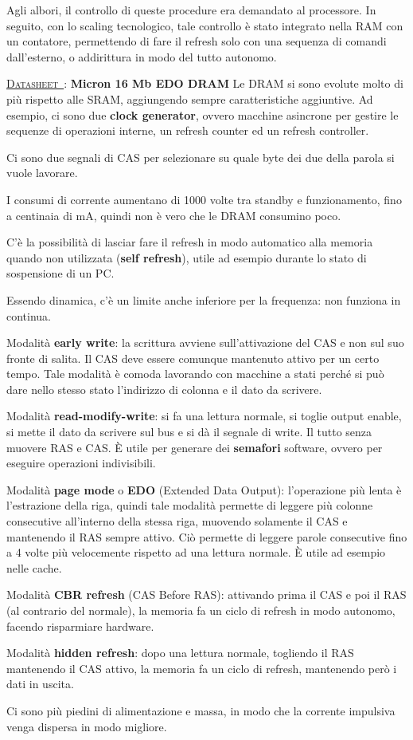 \documentclass[11pt,4paper]{report}
\newcounter{datasheetcnt}
\renewcommand{\thedatasheetcnt}{\arabic{datasheetcnt}}
\newenvironment{datasheet}[2]{\refstepcounter{datasheetcnt}\par\bigskip\medskip \label{#2}
	\noindent \underline{\textsc{Datasheet~\thedatasheetcnt}}: \textbf{#1} \newline}{\medskip}
\begin{document}
Agli albori, il controllo di queste procedure era demandato al processore. In seguito, con lo scaling tecnologico, tale controllo è stato integrato nella RAM con un contatore, permettendo di fare il refresh solo con una sequenza di comandi dall'esterno, o addirittura in modo del tutto autonomo.
\begin{datasheet}{Micron 16 Mb EDO DRAM}{}
Le DRAM si sono evolute molto di più rispetto alle SRAM, aggiungendo sempre caratteristiche aggiuntive. Ad esempio, ci sono due \textbf{clock generator}, ovvero macchine asincrone per gestire le sequenze di operazioni interne, un refresh counter ed un refresh controller.

Ci sono due segnali di CAS per selezionare su quale byte dei due della parola si vuole lavorare.

I consumi di corrente aumentano di 1000 volte tra standby e funzionamento, fino a centinaia di \si{\milli\ampere}, quindi non è vero che le DRAM consumino poco.

C'è la possibilità di lasciar fare il refresh in modo automatico alla memoria quando non utilizzata (\textbf{self refresh}), utile ad esempio durante lo stato di sospensione di un PC.

Essendo dinamica, c'è un limite anche inferiore per la frequenza: non funziona in continua.

Modalità \textbf{early write}: la scrittura avviene sull'attivazione del CAS e non sul suo fronte di salita. Il CAS deve essere comunque mantenuto attivo per un certo tempo. Tale modalità è comoda lavorando con macchine a stati perché si può dare nello stesso stato l'indirizzo di colonna e il dato da scrivere.

Modalità \textbf{read-modify-write}: si fa una lettura normale, si toglie output enable, si mette il dato da scrivere sul bus e si dà il segnale di write. Il tutto senza muovere RAS e CAS. È utile per generare dei \textbf{semafori} software, ovvero per eseguire operazioni indivisibili.

Modalità \textbf{page mode} o \textbf{EDO} (Extended Data Output): l'operazione più lenta è l'estrazione della riga, quindi tale modalità permette di leggere più colonne consecutive all'interno della stessa riga, muovendo solamente il CAS e mantenendo il RAS sempre attivo. Ciò permette di leggere parole consecutive fino a 4 volte più velocemente rispetto ad una lettura normale. È utile ad esempio nelle cache.

Modalità \textbf{CBR refresh} (CAS Before RAS): attivando prima il CAS e poi il RAS (al contrario del normale), la memoria fa un ciclo di refresh in modo autonomo, facendo risparmiare hardware.

Modalità \textbf{hidden refresh}: dopo una lettura normale, togliendo il RAS mantenendo il CAS attivo, la memoria fa un ciclo di refresh, mantenendo però i dati in uscita.

Ci sono più piedini di alimentazione e massa, in modo che la corrente impulsiva venga dispersa in modo migliore.
\end{datasheet}
\end{document}
